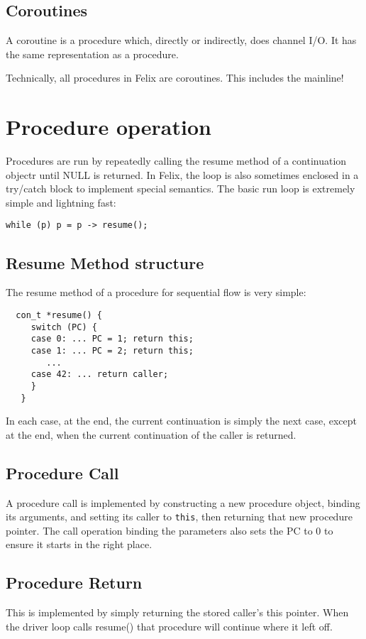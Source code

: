 \documentclass[oneside]{book}
\begin{document}
\subsection{Coroutines}
A coroutine is a procedure which, directly or indirectly, does channel I/O.
It has the same representation as a procedure.

Technically, all procedures in Felix are coroutines. This includes the mainline!

\section{Procedure operation}
Procedures are run by repeatedly calling the resume method of a continuation
objectr until NULL is returned. In Felix, the loop is also sometimes enclosed
in a try/catch block to implement special semantics. The basic run loop is
extremely simple and lightning fast:

\begin{verbatim}
while (p) p = p -> resume();
\end{verbatim}

\subsection{Resume Method structure}
The resume method of a procedure for sequential flow is very simple:
\begin{verbatim}
  con_t *resume() {
     switch (PC) {
     case 0: ... PC = 1; return this;
     case 1: ... PC = 2; return this;
        ...
     case 42: ... return caller;
     }
   }
\end{verbatim}

In each case, at the end, the current continuation is simply the next case,
except at the end, when the current continuation of the caller is returned.

\subsection{Procedure Call}
A procedure call is implemented by constructing a new procedure object,
binding its arguments, and setting its caller to \verb$this$, then returning
that new procedure pointer. The call operation binding the parameters
also sets the PC to 0 to ensure it starts in the right place.

\subsection{Procedure Return}
This is implemented by simply returning the stored caller's this pointer.
When the driver loop calls resume() that procedure will continue where it left off.
\end{document}
